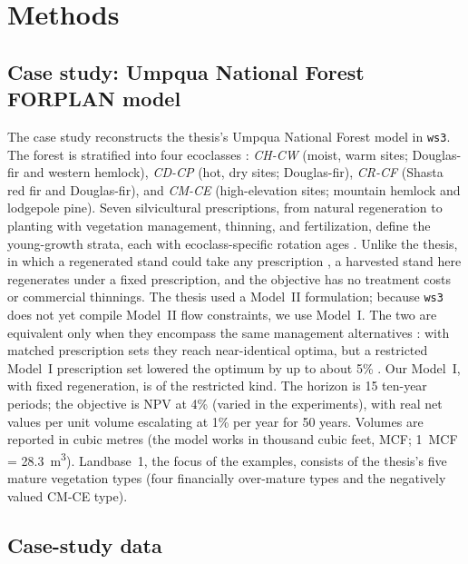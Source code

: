 \section{Methods}

\hypertarget{case-study-the-umpqua-national-forest-forplan-model}{%
\subsection{Case study: Umpqua National Forest FORPLAN model}\label{case-study-the-umpqua-national-forest-forplan-model}}

The case study reconstructs the thesis's Umpqua National Forest model in \texttt{ws3}. The forest is stratified into four ecoclasses \citep[Table~5.1]{daugherty1991credibility}: \textit{CH-CW} (moist, warm sites; Douglas-fir and western hemlock), \textit{CD-CP} (hot, dry sites; Douglas-fir), \textit{CR-CF} (Shasta red fir and Douglas-fir), and \textit{CM-CE} (high-elevation sites; mountain hemlock and lodgepole pine). Seven silvicultural prescriptions, from natural regeneration to planting with vegetation management, thinning, and fertilization, define the young-growth strata, each with ecoclass-specific rotation ages \citep[Table~5.2]{daugherty1991credibility}. Unlike the thesis, in which a regenerated stand could take any prescription \citep[pp.~28--29, 74]{daugherty1991credibility}, a harvested stand here regenerates under a fixed prescription, and the objective has no treatment costs or commercial thinnings. The thesis used a Model~II formulation; because \texttt{ws3} does not yet compile Model~II flow constraints, we use Model~I. The two are equivalent only when they encompass the same management alternatives \citep[pp.~328--329]{gunn2007models}: with matched prescription sets they reach near-identical optima, but a restricted Model~I prescription set lowered the optimum by up to about 5\% \citep{martin2017comparing}. Our Model~I, with fixed regeneration, is of the restricted kind. The horizon is 15 ten-year periods; the objective is NPV at 4\% (varied in the experiments), with real net values per unit volume escalating at 1\% per year for 50 years. Volumes are reported in cubic metres (the model works in thousand cubic feet, MCF; 1~MCF = \SI{28.3}{\metre\cubed}). Landbase~1, the focus of the examples, consists of the thesis's five mature vegetation types (four financially over-mature types and the negatively valued CM-CE type).

\hypertarget{case-study-data}{%
\subsection{Case-study data}\label{case-study-data}}

